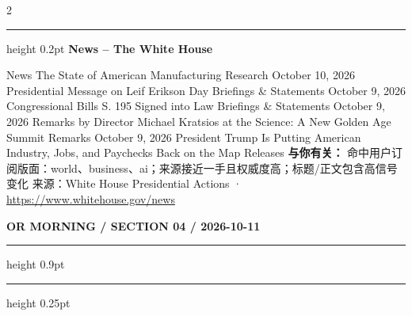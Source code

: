 \documentclass[10.5pt]{ctexart}
\begin{document}
\begin{multicols}{2}
\vspace{2mm}
\hrule height 0.2pt
\vspace{2mm}
{\large\bfseries News – The White House}\par
News The State of American Manufacturing Research October 10, 2026 Presidential Message on Leif Erikson Day Briefings \& Statements October 9, 2026 Congressional Bills S. 195 Signed into Law Briefings \& Statements October 9, 2026 Remarks by Director Michael Kratsios at the Science: A New Golden Age Summit Remarks October 9, 2026 President Trump Is Putting American Industry, Jobs, and Paychecks Back on the Map Releases
\textbf{与你有关：} 命中用户订阅版面：world、business、ai；来源接近一手且权威度高；标题/正文包含高信号变化
{\footnotesize\color{ormuted} 来源：White House Presidential Actions · \url{https://www.whitehouse.gov/news}}
\end{multicols}
\newpage
{\small\bfseries OR MORNING / SECTION 04 / 2026-10-11}
\vspace{2mm}
\hrule height 0.9pt
\vspace{1.5mm}
\hrule height 0.25pt
\vspace{4mm}
\end{document}
